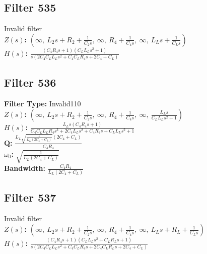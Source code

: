 \documentclass{article}
\begin{document}
\subsection*{Filter 535}
Invalid filter \\ 
\textbf{$Z(s)$:} $\left( \infty, \  L_{2} s + R_{2} + \frac{1}{C_{2} s}, \  \infty, \  R_{4} + \frac{1}{C_{4} s}, \  \infty, \  L_{L} s + \frac{1}{C_{L} s}\right)$ \\ 
\textbf{$H(s)$:} $\frac{\left(C_{4} R_{4} s + 1\right) \left(C_{L} L_{L} s^{2} + 1\right)}{s \left(2 C_{4} C_{L} L_{L} s^{2} + C_{4} C_{L} R_{4} s + 2 C_{4} + C_{L}\right)}$ \\ 
\subsection*{Filter 536}
\textbf{Filter Type:} Invalid110 \\ 
\textbf{$Z(s)$:} $\left( \infty, \  L_{2} s + R_{2} + \frac{1}{C_{2} s}, \  \infty, \  R_{4} + \frac{1}{C_{4} s}, \  \infty, \  \frac{L_{L} s}{C_{L} L_{L} s^{2} + 1}\right)$ \\ 
\textbf{$H(s)$:} $\frac{L_{L} s \left(C_{4} R_{4} s + 1\right)}{C_{4} C_{L} L_{L} R_{4} s^{3} + 2 C_{4} L_{L} s^{2} + C_{4} R_{4} s + C_{L} L_{L} s^{2} + 1}$ \\ 
\textbf{Q:} $\frac{L_{L} \sqrt{\frac{1}{L_{L} \left(2 C_{4} + C_{L}\right)}} \left(2 C_{4} + C_{L}\right)}{C_{4} R_{4}}$ \\ 
\textbf{$\omega_0$:} $\sqrt{\frac{1}{L_{L} \left(2 C_{4} + C_{L}\right)}}$ \\ 
\textbf{Bandwidth:} $\frac{C_{4} R_{4}}{L_{L} \left(2 C_{4} + C_{L}\right)}$ \\ 
\subsection*{Filter 537}
Invalid filter \\ 
\textbf{$Z(s)$:} $\left( \infty, \  L_{2} s + R_{2} + \frac{1}{C_{2} s}, \  \infty, \  R_{4} + \frac{1}{C_{4} s}, \  \infty, \  L_{L} s + R_{L} + \frac{1}{C_{L} s}\right)$ \\ 
\textbf{$H(s)$:} $\frac{\left(C_{4} R_{4} s + 1\right) \left(C_{L} L_{L} s^{2} + C_{L} R_{L} s + 1\right)}{s \left(2 C_{4} C_{L} L_{L} s^{2} + C_{4} C_{L} R_{4} s + 2 C_{4} C_{L} R_{L} s + 2 C_{4} + C_{L}\right)}$ \\ 
\end{document}
